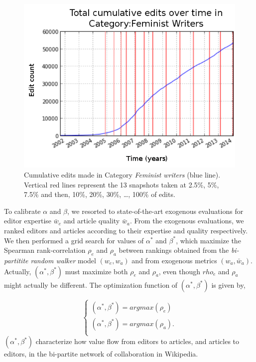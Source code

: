 \begin{figure}[!t]
\centering
\includegraphics[width=0.9\columnwidth]{../Figures/cumulative_snapshots_Feminist_Writers_thirteen.png}
\caption{Cumulative edits made in Category {\it Feminist writers} (blue line). Vertical red lines represent the 13 snapshots taken at 2.5\%, 5\%, 7.5\% and then, 10\%, 20\%, 30\%, \ldots , 100\% of edits.}
\label{fig:snapshots}
\end{figure}

To calibrate $\alpha$ and $\beta$, we resorted to state-of-the-art exogenous evaluations for editor expertise $\bar{w}_e$ and article quality $\bar{w}_a$. From the exogenous evaluations, we ranked editors and articles according to their expertise and quality respectively. We then performed  a grid search for values of $\alpha^*$ and $\beta^*$, which maximize the Spearman rank-correlation $\rho_e$ and $\rho_a$ between rankings obtained from the {\it bi-partitite random walker} model $(w_e,w_a)$ and from exogenous metrics $(w_a,\bar{w}_a)$. Actually, $(\alpha^*,\beta^*)$ must maximize both $\rho_e$ and $\rho_a$, even though $rho_e$ and $\rho_a$ might actually be different. The optimization function  of $(\alpha^*,\beta^*)$ is given by,

\begin{equation}
\begin{cases}
(\alpha^*,\beta^*) = argmax(\rho_e)\\
(\alpha^*,\beta^*) = argmax(\rho_a).\\
\end{cases}
\end{equation}
$(\alpha^*,\beta^*)$ characterize how value flow from editors to articles, and articles to editors, in the bi-partite network of collaboration in Wikipedia.

